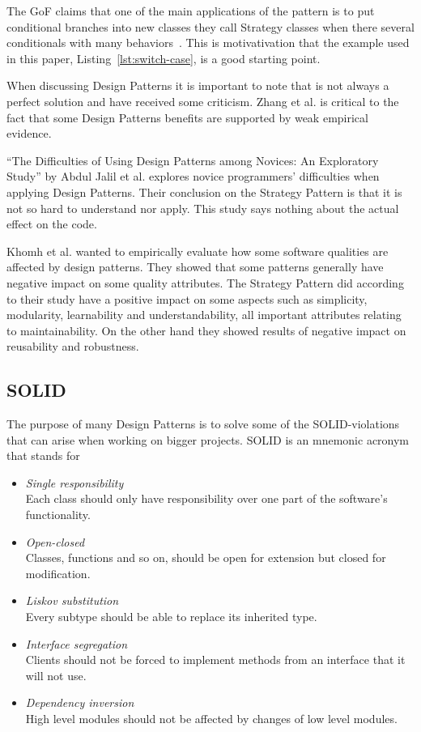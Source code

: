 \documentclass[conference, a4paper]{IEEEtran}
\begin{document}
The GoF claims that one of the main applications of the pattern is to put conditional branches into new classes they call Strategy classes when there several conditionals with many behaviors~\cite{bibitem:GoF}. This is motivativation that the example used in this paper, Listing~\ref{lst:switch-case}, is a good starting point.

When discussing Design Patterns it is important to note that is not always a perfect solution and have received some criticism. Zhang et al. is critical to the fact that some Design Patterns benefits are supported by weak empirical evidence.~\cite{bibitem:Zhang}

``The Difficulties of Using Design Patterns among Novices: An Exploratory Study'' by Abdul Jalil et al. explores novice programmers' difficulties when applying Design Patterns. Their conclusion on the Strategy Pattern is that it is not so hard to understand nor apply. This study says nothing about the actual effect on the code.~\cite{bibitem:Jalil}

Khomh et al. wanted to empirically evaluate how some software qualities are affected by design patterns. They showed that some patterns generally  have negative impact on some quality attributes. The Strategy Pattern did according to their study have a positive impact on some aspects such as simplicity, modularity, learnability and understandability, all important attributes relating to maintainability. On the other hand they showed results of negative impact on reusability and robustness.~\cite{bibitem:DPaSQ}

\subsection{SOLID}
The purpose of many Design Patterns is to solve some of the SOLID-violations that can arise when working on bigger projects. SOLID is an mnemonic acronym that stands for
\begin{itemize}
    \item \emph{Single responsibility} \\
    Each class should only have responsibility over one part of the software's functionality.
    \item \emph{Open-closed} \\
    Classes, functions and so on, should be open for extension but closed for modification.
    \item \emph{Liskov substitution} \\
    Every subtype should be able to replace its inherited type.
    \item \emph{Interface segregation} \\
    Clients should not be forced to implement methods from an interface that it will not use.
    \item \emph{Dependency inversion} \\
    High level modules should not be affected by changes of low level modules.
\end{itemize}
\end{document}
